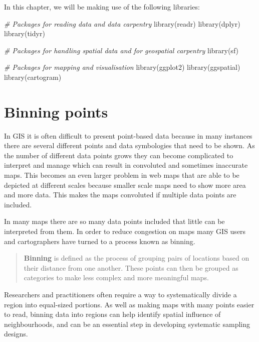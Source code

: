 \documentclass[
]{book}
\newenvironment{Shaded}{\begin{snugshade}}{\end{snugshade}}
\newcommand{\CommentTok}[1]{\textcolor[rgb]{0.56,0.35,0.01}{\textit{#1}}}
\newcommand{\FunctionTok}[1]{\textcolor[rgb]{0.00,0.00,0.00}{#1}}
\newcommand{\NormalTok}[1]{#1}
\begin{document}
In this chapter, we will be making use of the following libraries:

\begin{Shaded}
\begin{Highlighting}[]
\CommentTok{\# Packages for reading data and data carpentry}
\FunctionTok{library}\NormalTok{(readr)}
\FunctionTok{library}\NormalTok{(dplyr)}
\FunctionTok{library}\NormalTok{(tidyr)}

\CommentTok{\# Packages for handling spatial data and for geospatial carpentry}
\FunctionTok{library}\NormalTok{(sf)}

\CommentTok{\# Packages for mapping and visualisation}
\FunctionTok{library}\NormalTok{(ggplot2)}
\FunctionTok{library}\NormalTok{(ggspatial)}
\FunctionTok{library}\NormalTok{(cartogram)}
\end{Highlighting}
\end{Shaded}

\hypertarget{binning-points}{%
\section{Binning points}\label{binning-points}}

In GIS it is often difficult to present point-based data because in many instances there are several different points and data symbologies that need to be shown. As the number of different data points grows they can become complicated to interpret and manage which can result in convoluted and sometimes inaccurate maps. This becomes an even larger problem in web maps that are able to be depicted at different scales because smaller scale maps need to show more area and more data. This makes the maps convoluted if multiple data points are included.

In many maps there are so many data points included that little can be interpreted from them. In order to reduce congestion on maps many GIS users and cartographers have turned to a process known as binning.

\begin{quote}
\textbf{Binning} is defined as the process of grouping pairs of locations based on their distance from one another. These points can then be grouped as categories to make less complex and more meaningful maps.
\end{quote}

Researchers and practitioners often require a way to systematically divide a region into equal-sized portions. As well as making maps with many points easier to read, binning data into regions can help identify spatial influence of neighbourhoods, and can be an essential step in developing systematic sampling designs.
\end{document}
